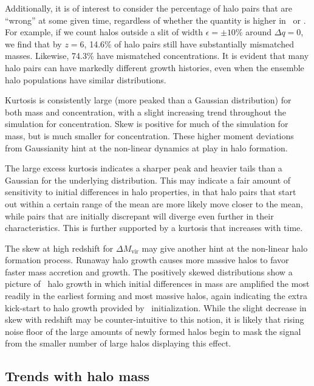 Additionally, it is of interest to consider the percentage of halo pairs that are ``wrong'' at some given time, regardless of whether the quantity is higher in \lpt\ or \za.  For example, if we count halos outside a slit of width $\epsilon = \pm 10\%$ around $\Delta q = 0$, we find that by $z = 6$, 14.6\% of halo pairs still have substantially mismatched masses.  Likewise, 74.3\% have mismatched concentrations.  It is evident that many halo pairs can have markedly different growth histories, even when the ensemble halo populations have similar distributions.

Kurtosis is consistently large (more peaked than a Gaussian distribution) for both mass and concentration, with a slight increasing trend throughout the simulation for concentration.  Skew is positive for much of the simulation for mass, but is much smaller for concentration.  These higher moment deviations from Gaussianity hint at the non-linear dynamics at play in halo formation.

The large excess kurtosis indicates a sharper peak and heavier tails than a Gaussian for the underlying distribution.  This may indicate a fair amount of sensitivity to initial differences in halo properties, in that halo pairs that start out within a certain range of the mean are more likely move closer to the mean, while pairs that are initially discrepant will diverge even further in their characteristics.  This is further supported by a kurtosis that increases with time.

The skew at high redshift for $\Delta M_{\mathrm{vir}}$ may give another hint at the non-linear halo formation process.  Runaway halo growth causes more massive halos to favor faster mass accretion and growth.  The positively skewed distributions show a picture of \lpt\ halo growth in which initial differences in mass are amplified the most readily in the earliest forming and most massive halos, again indicating the extra kick-start to halo growth provided by \lpt\ initialization.  While the slight decrease in skew with redshift may be counter-intuitive to this notion, it is likely that rising noise floor of the large amounts of newly formed halos begin to mask the signal from the smaller number of large halos displaying this effect.




\subsection{Trends with halo mass}



